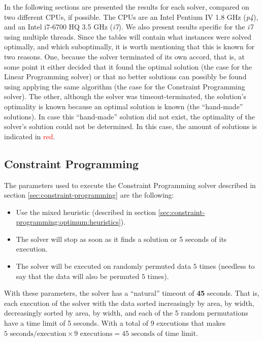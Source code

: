 In the following sections are presented the results for each solver, compared
on two different CPUs, if possible. The CPUs are an Intel Pentium IV 1.8 GHz
(\textit{p4}), and an Intel i7-6700 HQ 3.5 GHz (\textit{i7}). We also present
results specific for the \textit{i7} using multiple threads. Since the tables
will contain what instances were solved optimally, and which suboptimally, 
it is worth mentioning that this is known for two reasons. One, because the solver
terminated of its own accord, that is, at some point it either decided that
it found the optimal solution (the case for the Linear Programming solver) or
that no better solutions can possibly be found using applying the same algorithm
(the case for the Constraint Programming solver). The other, although the solver
was timeout-terminated, the solution's optimality is known because an optimal
solution is known (the ``hand-made'' solutions). In case this ``hand-made''
solution did not exist, the optimality of the solver's solution could not be
determined. In this case, the amount of solutions is indicated in \textcolor{red}{red}.

\subsection{Constraint Programming}
\label{sec:benchmarking:constraint-programming}

The parameters used to execute the Constraint Programming solver described in section
\ref{sec:constraint-programming} are the following:
\begin{itemize}
	\item Use the mixed heuristic (described in section \ref{sec:constraint-programming:optimum:heuristics}).
	\item The solver will stop as soon as it finds a solution or 5 seconds of its execution.
	\item The solver will be executed on randomly permuted data $5$ times (needless to
	say that the data will also be permuted $5$ times).
\end{itemize}

With these parameters, the solver has a ``natural'' timeout of \textbf{45} seconds.
That is, each execution of the solver with the data sorted increasingly by area, by
width, decreasingly sorted by area, by width, and each of the 5 random permutations
have a time limit of 5 seconds. With a total of 9 executions that makes
$5 \text{ seconds/execution} \times 9 \text{ executions} = 45 \text{ seconds}$ of time limit.

